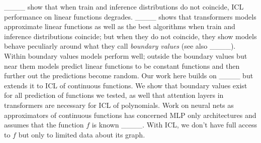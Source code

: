
____ show that when train and inference distributions do not coincide, ICL performance on linear functions degrades.  ____ shows that transformers models approximate linear functions as well as the best algorithms when train and inference distributions coincide; but when they do not coincide, they show models behave peculiarly around what they call {\em boundary values} (see also ____).  Within boundary values models perform well; outside the boundary values but near them models predict linear functions to be constant functions and then further out the predictions become random.       %
 Our work here builds on ____ but extends it to ICL of continuous functions. We show that boundary values exist for all prediction of functions we tested, as well that attention layers in transformers are necessary for ICL of polynomials. Work on neural nets as approximators of continuous functions has concerned MLP only architectures and assumes that the function $f$ is known ____. With ICL, we don't have full access to $f$ but only to limited data about its graph.     %
